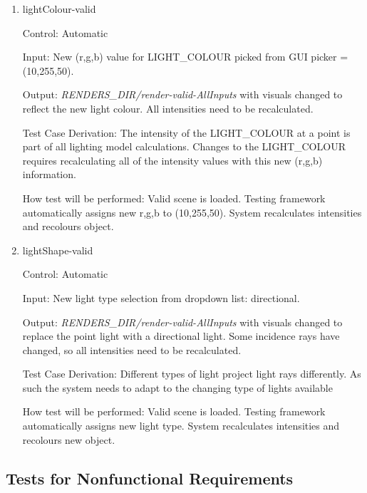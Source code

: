 \documentclass[12pt, titlepage]{article}
\begin{document}
\begin{enumerate}
	\item{lightColour-valid\\}
	
	Control: Automatic
	
	Input: New (r,g,b) value for LIGHT\_COLOUR picked from GUI picker = 
	(10,255,50).
	
	Output: \textit{RENDERS\_DIR/render-valid-AllInputs} with visuals changed 
	to reflect the new light colour. All intensities need to be 
	recalculated.
	
	Test Case Derivation: The intensity of the LIGHT\_COLOUR at a point is part 
	of all lighting model calculations. Changes to the LIGHT\_COLOUR requires 
	recalculating all of the intensity values with this new (r,g,b) information.
	
	How test will be performed: Valid scene is loaded. Testing framework 
	automatically assigns new r,g,b to (10,255,50). System recalculates 
	intensities and recolours object.		


	\item{lightShape-valid\\}
	
	Control: Automatic
	
	Input: New light type selection from dropdown list: directional.
	
	Output: \textit{RENDERS\_DIR/render-valid-AllInputs} with visuals changed 
	to replace the point light with a directional light. Some incidence rays 
	have changed, so all intensities need to be recalculated.
	
	Test Case Derivation: Different types of light project light rays 
	differently. As such the system needs to adapt to the changing type of 
	lights available
	
	How test will be performed: Valid scene is loaded. Testing framework 
	automatically assigns new light type. System recalculates 
	intensities and recolours new object.
	
\end{enumerate}

\subsection{Tests for Nonfunctional Requirements}

\end{document}
